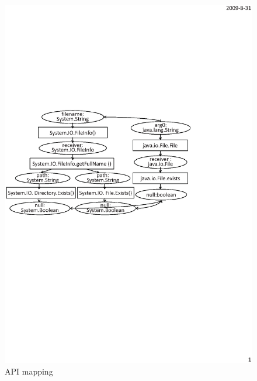 \begin{figure}[t]
\centering
\includegraphics[scale=0.65,clip]{figure/sample.eps}\vspace*{-3ex}
 \caption
{\label{fig:example}API mapping}\vspace*{-2ex}
\end{figure}

